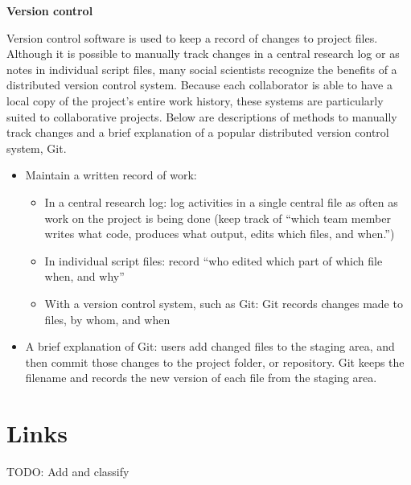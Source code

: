 \documentclass[]{book}
\providecommand{\tightlist}{%
  \setlength{\itemsep}{0pt}\setlength{\parskip}{0pt}}
\begin{document}
\textbf{Version control}

Version control software is used to keep a record of changes to project files. Although it is possible to manually track changes in a central research log or as notes in individual script files, many social scientists recognize the benefits of a distributed version control system. Because each collaborator is able to have a local copy of the project's entire work history, these systems are particularly suited to collaborative projects. Below are descriptions of methods to manually track changes and a brief explanation of a popular distributed version control system, Git.

\begin{itemize}
\item
  Maintain a written record of work:

  \begin{itemize}
  \tightlist
  \item
    In a central research log: log activities in a single central file as often as work on the project is being done (keep track of ``which team member writes what code, produces what output, edits which files, and when.'')
  \item
    In individual script files: record ``who edited which part of which file when, and why''
  \item
    With a version control system, such as Git: Git records changes made to files, by whom, and when
  \end{itemize}
\item
  A brief explanation of Git: users add changed files to the staging area, and then commit those changes to the project folder, or repository. Git keeps the filename and records the new version of each file from the staging area.
\end{itemize}

\hypertarget{links}{%
\section{Links}\label{links}}

TODO: Add and classify
\end{document}
